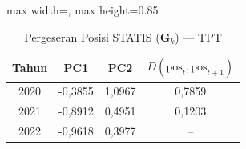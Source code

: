 \begin{table}[H]
\centering
\caption{Pergeseran Posisi STATIS ($\mathbf{G}_k$) --- TPT} \label{tab:sample2jarak_statis_loading_tpt}
\begin{adjustbox}{max width=\textwidth, max height=0.85\textheight}
\begin{tabular}{|c|c|c|c|}
\hline
\textbf{Tahun} & \textbf{PC1} & \textbf{PC2} & \textbf{$D(\text{pos}_t, \text{pos}_{t+1})$} \\
\hline
2020 & -0,3855 & 1,0967 & 0,7859 \\
2021 & -0,8912 & 0,4951 & 0,1203 \\
2022 & -0,9618 & 0,3977 & -- \\
\hline
\end{tabular}
\end{adjustbox}
\end{table}